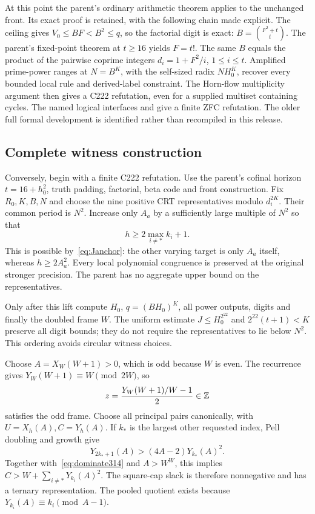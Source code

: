 At this point the parent's ordinary arithmetic theorem applies to the
unchanged front. Its exact proof is retained, with the following chain
made explicit. The ceiling gives $V_0\le BF<B^2\le q$, so the factorial
digit is exact: $B=\binom{F^2+t}{t}$. The parent's fixed-point theorem
at $t\ge16$ yields $F=t!$. The same $B$ equals the product of the
pairwise coprime integers $d_i=1+F^2/i$, $1\le i\le t$. Amplified
prime-power ranges at $N=B^K$, with the self-sized radix $NH_0^K$,
recover every bounded local rule and derived-label constraint. The
Horn-flow multiplicity argument then gives a C222 refutation, even for
a supplied multiset containing cycles. The named logical interfaces
 and
give a finite ZFC refutation. The older full formal development is
identified rather than recompiled in this release.

\subsection{Complete witness construction}

Conversely, begin with a finite C222 refutation. Use the parent's
cofinal horizon $t=16+h_0^2$, truth padding, factorial, beta code and
front construction. Fix $R_0,K,B,N$ and choose the nine positive CRT
representatives modulo $d_i^{2K}$. Their common period is $N^2$.
Increase only $A_a$ by a sufficiently large multiple of $N^2$ so that
\begin{equation}\label{eq:dominate314}
 h\ge2\max_{i\ne *}k_i+1.
\end{equation}
This is possible by~\eqref{eq:Janchor}: the other varying target is
only $A_a$ itself, whereas $h\ge2A_a^2$. Every local polynomial
congruence is preserved at the original stronger precision. The parent
has no aggregate upper bound on the representatives.

Only after this lift compute $H_0$, $q=(BH_0)^K$, all power outputs,
digits and finally the doubled frame $W$. The uniform estimate
$J\le H_0^{2^{22}}$ and $2^{22}(t+1)<K$ preserve all digit bounds;
they do not require the representatives to lie below $N^2$.
This ordering avoids circular witness choices.

Choose $A=X_W(W+1)>0$, which is odd because $W$ is even.
The recurrence gives $Y_W(W+1)\equiv W\pmod{2W}$, so
\[
 z=\frac{Y_W(W+1)/W-1}{2}\in\mathbb Z
\]
satisfies the odd frame. Choose all principal pairs canonically, with
$U=X_h(A),C=Y_h(A)$. If $k_*$ is the largest other requested index,
Pell doubling and growth give
\[
 Y_{2k_*+1}(A)>(4A-2)Y_{k_*}(A)^2.
\]
Together with~\eqref{eq:dominate314} and $A>W^W$, this implies
$C>W+\sum_{i\ne *}Y_{k_i}(A)^2$. The square-cap slack is therefore
nonnegative and has a ternary representation. The pooled quotient
exists because $Y_{k_i}(A)\equiv k_i\pmod{A-1}$.

